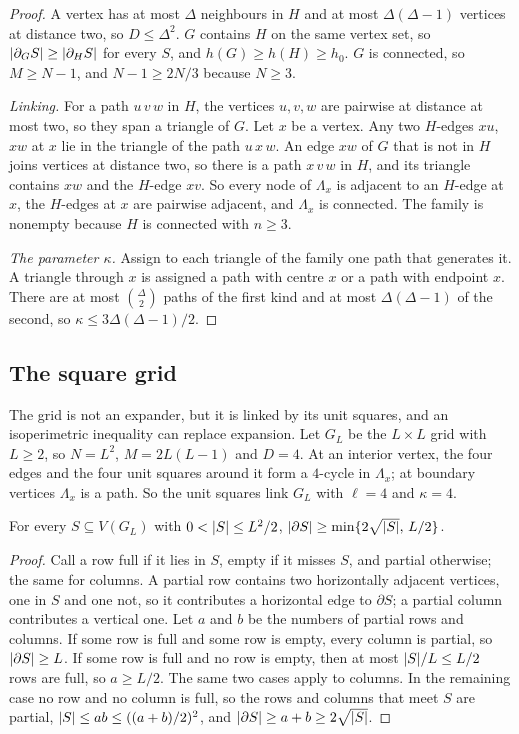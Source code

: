 \begin{proof}
A vertex has at most $\Delta$ neighbours in $H$ and at most $\Delta(\Delta-1)$ vertices at distance two, so $D\le\Delta^2$. $G$ contains $H$ on the same vertex set, so $\lvert \partial_GS\rvert\ge\lvert \partial_HS\rvert$ for every $S$, and $h(G)\ge h(H)\ge h_0$. $G$ is connected, so $M\ge N-1$, and $N-1\ge2N/3$ because $N\ge3$.

\emph{Linking.} For a path $u\,v\,w$ in $H$, the vertices $u,v,w$ are pairwise at distance at most two, so they span a triangle of $G$. Let $x$ be a vertex. Any two $H$-edges $xu$, $xw$ at $x$ lie in the triangle of the path $u\,x\,w$. An edge $xw$ of $G$ that is not in $H$ joins vertices at distance two, so there is a path $x\,v\,w$ in $H$, and its triangle contains $xw$ and the $H$-edge $xv$. So every node of $\Lambda_x$ is adjacent to an $H$-edge at $x$, the $H$-edges at $x$ are pairwise adjacent, and $\Lambda_x$ is connected. The family is nonempty because $H$ is connected with $n\ge3$.

\emph{The parameter $\kappa$.} Assign to each triangle of the family one path that generates it. A triangle through $x$ is assigned a path with centre $x$ or a path with endpoint $x$. There are at most $\binom\Delta2$ paths of the first kind and at most $\Delta(\Delta-1)$ of the second, so $\kappa\le3\Delta(\Delta-1)/2$.
\end{proof}

\subsection{The square grid}

The grid is not an expander, but it is linked by its unit squares, and an isoperimetric inequality can replace expansion. Let $G_L$ be the $L\times L$ grid with $L\ge2$, so $N=L^2$, $M=2L(L-1)$ and $D=4$. At an interior vertex, the four edges and the four unit squares around it form a $4$-cycle in $\Lambda_x$; at boundary vertices $\Lambda_x$ is a path. So the unit squares link $G_L$ with $\ell=4$ and $\kappa=4$.

\begin{lemma}\label{lem:grid-iso}
For every $S\subseteq V(G_L)$ with $0<\lvert S\rvert\le L^2/2$, $\lvert \partial S\rvert\ge\min\{2\sqrt{\lvert S\rvert},\,L/2\}$.
\end{lemma}

\begin{proof}
Call a row full if it lies in $S$, empty if it misses $S$, and partial otherwise; the same for columns. A partial row contains two horizontally adjacent vertices, one in $S$ and one not, so it contributes a horizontal edge to $\partial S$; a partial column contributes a vertical one. Let $a$ and $b$ be the numbers of partial rows and columns.
If some row is full and some row is empty, every column is partial, so $\lvert \partial S\rvert\ge L$. If some row is full and no row is empty, then at most $\lvert S\rvert/L\le L/2$ rows are full, so $a\ge L/2$. The same two cases apply to columns. In the remaining case no row and no column is full, so the rows and columns that meet $S$ are partial, $\lvert S\rvert\le ab\le((a+b)/2)^2$, and $\lvert \partial S\rvert\ge a+b\ge2\sqrt{\lvert S\rvert}$.
\end{proof}


